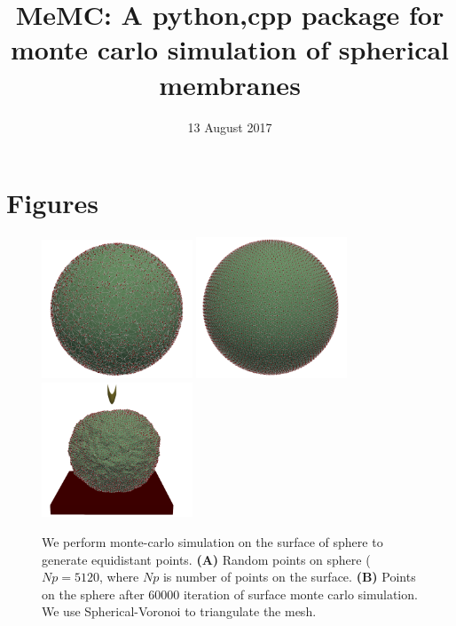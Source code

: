 \documentclass[
]{article}
\title{MeMC: A python,cpp package for monte carlo simulation of
spherical membranes}
\author{}
\date{13 August 2017}
\begin{document}
\maketitle

\hypertarget{figures}{%
\section{Figures}\label{figures}}
\begin{figure}
  \includegraphics[width=0.4\textwidth,height=\textheight]{figs/surf_mc_random.png}
  \includegraphics[width=0.4\textwidth,height=\textheight]{figs/surf_mc_lattice.png}
  \includegraphics[width=0.4\textwidth,height=\textheight]{figs/tip_1p05.png}
  \label{fig:surf_mc}
  \caption{We perform monte-carlo simulation on the surface of sphere to generate equidistant points. \textbf{(A)} Random points on sphere ($Np=5120$, where $Np$ is number of points on the surface. \textbf{(B)} Points on the sphere after 60000 iteration of surface monte carlo simulation. We use Spherical-Voronoi to triangulate the mesh.}
\end{figure}
\end{document}
